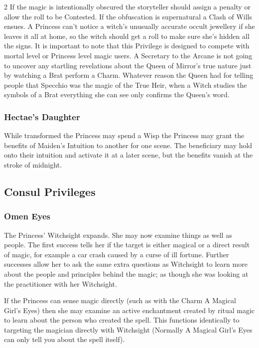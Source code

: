 \begin{multicols}{2}
If the magic is intentionally obscured the storyteller should assign a penalty or allow the roll to be Contested. If the obfuscation is supernatural a Clash of Wills ensues. A Princess can't notice a witch's unusually accurate occult jewellery if she leaves it all at home, so the witch should get a roll to make sure she's hidden all the signs. It is important to note that this Privilege is designed to compete with mortal level or Princess level magic users. A Secretary to the Arcane is not going to uncover any startling revelations about the Queen of Mirror's true nature just by watching a Brat perform a Charm. Whatever reason the Queen had for telling people that Specchio was the magic of the True Heir, when a Witch studies the symbols of a Brat everything she can see only confirms the Queen's word. 

\subsubsection*{Hectae's Daughter}

While transformed the Princess may spend a Wisp the Princess may grant the benefits of Maiden's Intuition to another for one scene. The beneficiary may hold onto their intuition and activate it at a later scene, but the benefits vanish at the stroke of midnight. 

\subsection*{Consul Privileges}

\subsubsection*{Omen Eyes}

The Princess' Witchsight expands. She may now examine things as well as people. The first success tells her if the target is either magical or a direct result of magic, for example a car crash caused by a curse of ill fortune. Further successes allow her to ask the same extra questions as Witchsight to learn more about the people and principles behind the magic; as though she was looking at the practitioner with her Witchsight. 

If the Princess can sense magic directly (such as with the Charm A Magical Girl's Eyes) then she may examine an active enchantment created by ritual magic to learn about the person who created the spell. This functions identically to targeting the magician directly with Witchsight (Normally A Magical Girl's Eyes can only tell you about the spell itself).


\end{multicols}
